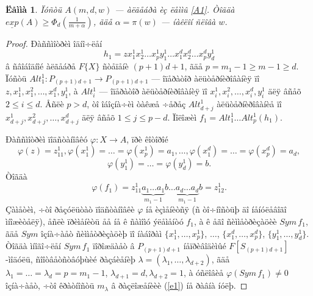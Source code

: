 \documentclass{article}
\numberwithin{equation}{section}
\theoremstyle{plain}
\newtheorem{lemma}{Ëåììà}[section]
\theoremstyle{definition}
\newtheorem{proof}{Äîêàçàòåëüñòâî}
\begin{document}
\begin{fulltext}
\begin{lemma}\label{A2}
Ïóñòü $A(m,d,w)$ --- àëãåáðà èç ëåììû \ref{A1}. Òîãäà $\underline{exp}(A)\ge
\Phi_d\left(\frac{1}{m+\alpha}\right)$, ãäå $\alpha=\pi(w)$ --- íàêëîí ñëîâà $w$.
\end{lemma}

\begin{proof}
Ðàññìîòðèì îäíî÷ëåí
$$
h_1=zx^1_1x^1_2\ldots x^1_py^1_1\ldots x^d_1x^d_2\ldots x^d_py^1_d
$$
â ñâîáîäíîé àëãåáðå $F\{X\}$ ñòåïåíè $(p+1)d+1$, ãäå $p=m_1-1 \ge m-1\ge d$. Ïóñòü 
$Alt^1_1:P_{(p+1)d+1}\to P_{(p+1)d+1}$ --- îïåðàòîð àëüòåðíèðîâàíèÿ ïî
$z,x^1_1, x^2_1,\ldots, x^d_1,y^1_1$, à $Alt^1_i$ --- îïåðàòîð àëüòåðíèðîâàíèÿ ïî
$x^1_i, x^2_i,\ldots, x^d_i,y^1_i$ äëÿ âñåõ $2\le i \le d$. Åñëè $p>d$, òî îáîçíà÷èì 
òàêæå ÷åðåç $Alt^1_{d+j}$ àëüòåðíèðîâàíèå ïî $x^1_{d+j}, x^2_{d+j},\ldots, x^d_{d+j}$
äëÿ âñåõ $1\le j \le p-d$. Ïîëîæèì $f_1= Alt^1_1\ldots Alt^1_p(h_1)$.

Ðàññìîòðèì ïîäñòàíîâêó $\varphi: X\to A$, ïðè êîòîðîé
$$
\varphi(z)=z^1_{11},\varphi(x^1_1)=\ldots =\varphi(x^1_p)=a_1,\ldots,
\varphi(x^d_1)=\ldots =\varphi(x^d_p)=a_d,
$$
$$
\varphi(y^1_1)=\ldots =\varphi(y^1_d)=b.
$$
Òîãäà
$$
\varphi(f_1)= z^1_{11}\underbrace{a_1\ldots a_1}_{m_1-1}b\ldots
\underbrace{a_d\ldots a_d}_{m_1-1}b= z^1_{12}.
$$
Çàìåòèì, ÷òî ðåçóëüòàò ïîäñòàíîâêè $\varphi$ íå èçìåíèòñÿ (ñ òî÷íîñòüþ äî íåíóëåâîãî
 ìíîæèòåëÿ), åñëè ïðèìåíèòü åå íå ê ñàìîìó
ýëåìåíòó $f_1$, à ê åãî ñèììåòðèçàöèè $Sym\, f_1$, ãäå $Sym$ îçíà÷àåò ñèììåòðèçàöèþ 
ïî íàáîðàì
$\{x^1_1,\ldots, x^1_p\}$, $\ldots$, $\{x^d_1,\ldots, x^d_p\}$, $\{y^1_1,\ldots, y^1_d\}$. 
Òîãäà ìíîãî÷ëåí $Sym\, f_1$ ïîðîæäàåò â $P_{(p+1)d+1}$ íåïðèâîäèìûé $F[S_{(p+1)d+1}]$-ìîäóëü,
ñîîòâåòñòâóþùèé ðàçáèåíèþ $\lambda =(\lambda_1,\ldots,\lambda_{d+2})$, ãäå
$\lambda_1=\ldots=\lambda_d=p=m_1-1$, $\lambda_{d+1}=d, \lambda_{d+2}=1$, à óñëîâèå
$\varphi(Sym\, f_1)\ne 0$ îçíà÷àåò, ÷òî êðàòíîñòü $m_\lambda$ â ðàçëîæåíèèè (\ref{e1}) íå
ðàâíà íóëþ.


\end{proof}
\end{fulltext}
\end{document}
